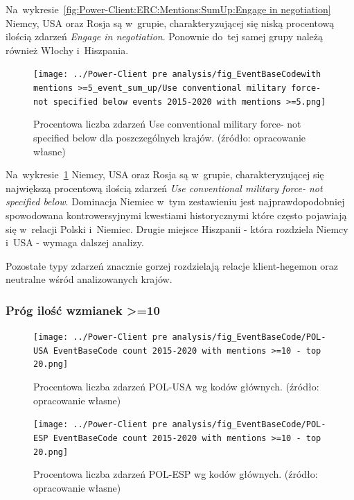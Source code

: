 \documentclass[11pt]{report}
\begin{document}
    Na~wykresie~\ref{fig:Power-Client:ERC:Mentions:SumUp:Engage in negotiation} Niemcy, USA oraz Rosja są w~grupie,
    charakteryzującej się niską procentową ilością zdarzeń \textit{Engage in negotiation}.
    Ponownie do~tej samej grupy należą również Włochy i~Hiszpania.

    \begin{figure}[tp]
        \centering
        \texttt{[image: ../Power-Client pre analysis/fig\_EventBaseCodewith mentions >=5\_event\_sum\_up/Use conventional military force- not specified below events 2015-2020 with mentions >=5.png]}
        \caption{Procentowa liczba zdarzeń Use conventional military force- not specified below dla poszczególnych krajów. (źródło: opracowanie własne)}
        \label{fig:Power-Client:ERC:Goldstein:SumUp:Use conventional military force- not specified below}
    \end{figure}

    Na~wykresie~\ref{fig:Power-Client:ERC:Goldstein:SumUp:Use conventional military force- not specified below} Niemcy, USA oraz Rosja są w~grupie,
    charakteryzującej się największą procentową ilością zdarzeń \textit{Use conventional military force- not specified below}.
    Dominacja Niemiec w~tym zestawieniu jest najprawdopodobniej spowodowana kontrowersyjnymi kwestiami historycznymi
    które często pojawiają się w~relacji Polski i~Niemiec.
    Drugie miejsce Hiszpanii - która rozdziela Niemcy i~USA - wymaga dalszej analizy.

    Pozostałe typy zdarzeń znacznie gorzej rozdzielają relacje klient-hegemon oraz neutralne wśród analizowanych krajów.

    \subsubsection{Próg ilość wzmianek >=10}

    \begin{figure}[tp]
        \centering
        \texttt{[image: ../Power-Client pre analysis/fig\_EventBaseCode/POL-USA EventBaseCode count 2015-2020 with mentions >=10 - top 20.png]}
        \caption{Procentowa liczba zdarzeń POL-USA wg kodów głównych. (źródło: opracowanie własne)}
        \label{fig:Power-Client:EBC:Mentions10:POL-USA}
    \end{figure}

    \begin{figure}[tp]
        \centering
        \texttt{[image: ../Power-Client pre analysis/fig\_EventBaseCode/POL-ESP EventBaseCode count 2015-2020 with mentions >=10 - top 20.png]}
        \caption{Procentowa liczba zdarzeń POL-ESP wg kodów głównych. (źródło: opracowanie własne)}
        \label{fig:Power-Client:EBC:Mentions10:POL-ESP}
    \end{figure}
\end{document}
